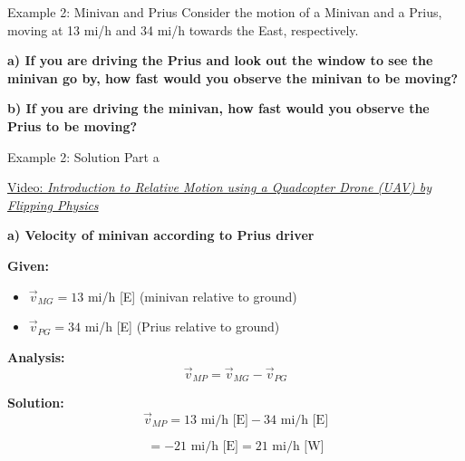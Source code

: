 \documentclass{beamer}
\begin{document}
\begin{frame}{Example 2: Minivan and Prius}
Consider the motion of a Minivan and a Prius, moving at 13 mi/h and 34 mi/h towards the East, respectively.

\vspace{0.5cm}

\begin{center}
\end{center}

\vspace{0.3cm}

\textbf{a) If you are driving the Prius and look out the window to see the minivan go by, how fast would you observe the minivan to be moving?}



\textbf{b) If you are driving the minivan, how fast would you observe the Prius to be moving?}
\end{frame}

\begin{frame}{Example 2: Solution Part a}

\href{https://youtu.be/jYMU6bn5GHY?si=V_nLU3Sra3oxjf_y}{Video: \textit{Introduction to Relative Motion using a Quadcopter Drone (UAV) by Flipping Physics}}
\vspace{0.3cm}

\textbf{a) Velocity of minivan according to Prius driver}



\textbf{Given:}
\begin{itemize}
\item \(\vec{v}_{MG} = 13\) mi/h [E] (minivan relative to ground)
\item \(\vec{v}_{PG} = 34\) mi/h [E] (Prius relative to ground)
\end{itemize}



\textbf{Analysis:}
\[\vec{v}_{MP} = \vec{v}_{MG} - \vec{v}_{PG}\]



\textbf{Solution:}
\[\vec{v}_{MP} = 13 \text{ mi/h [E]} - 34 \text{ mi/h [E]}\]

\[= -21 \text{ mi/h [E]} = 21 \text{ mi/h [W]}\]
\end{frame}
\end{document}

